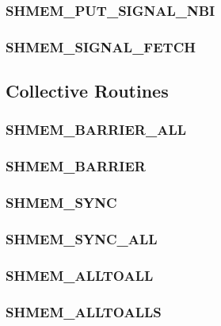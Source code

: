 \documentclass[10pt,oneside]{book}
\begin{document}
\subsubsection{\textbf{SHMEM\_PUT\_SIGNAL\_NBI}}\label{subsec:shmem_put_signal_nbi}


\subsubsection{\textbf{SHMEM\_SIGNAL\_FETCH}}\label{subsec:shmem_signal_fetch}




\subsection{Collective Routines}\label{subsec:coll}


\subsubsection{\textbf{SHMEM\_BARRIER\_ALL}}\label{subsec:shmem_barrier_all}


\subsubsection{\textbf{SHMEM\_BARRIER}}\label{subsec:shmem_barrier}


\subsubsection{\textbf{SHMEM\_SYNC}}\label{subsec:shmem_sync}


\subsubsection{\textbf{SHMEM\_SYNC\_ALL}}\label{subsec:shmem_sync_all}


\subsubsection{\textbf{SHMEM\_ALLTOALL}}\label{subsec:shmem_alltoall}


\subsubsection{\textbf{SHMEM\_ALLTOALLS}}\label{subsec:shmem_alltoalls}

\end{document}

